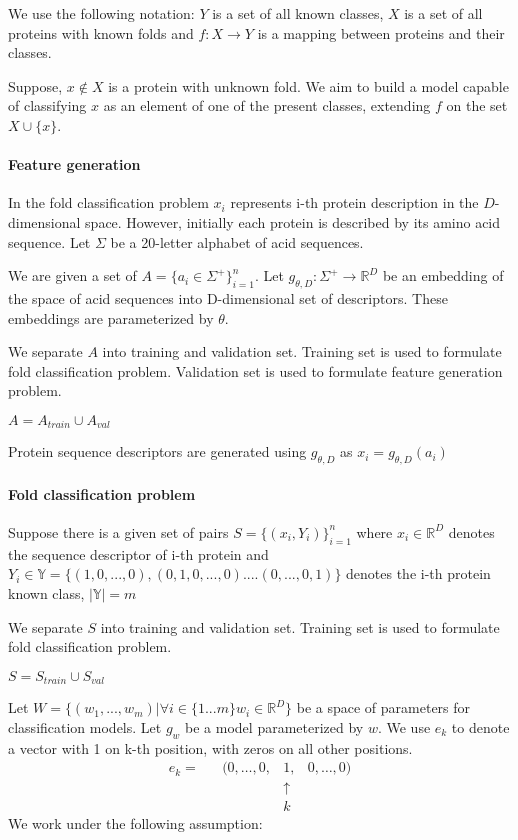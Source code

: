 \documentclass[12pt, twoside]{article}
\begin{document}
We use the following notation: $Y$ is a set of all known classes, $X$ is a set of all proteins with known folds and  $f: X \rightarrow Y$ is a mapping between proteins and their classes. 

Suppose, $x \not\in X$ is a protein with unknown fold. We aim to build a model capable of classifying $x$ as an element of one of the present classes, extending $f$ on the set $X \cup \{x\}$. 

\paragraph{Feature generation }
\noindent

In the fold classification problem $x_i$ represents i-th protein description in the $D$-dimensional space. However, initially each protein is described by its amino acid sequence. Let $\Sigma$ be a 20-letter alphabet of acid sequences.  

We are given a set of $A = \{a_i \in \Sigma^+\}_{i = 1}^n$. Let $g_{\theta, D}: \Sigma^+ \rightarrow \mathbb{R}^D$ be an embedding of the space of acid sequences into D-dimensional set of descriptors. These embeddings are parameterized  by $\theta$.

We separate $A$ into training and validation set. Training set is used to formulate fold classification problem. Validation set is used to formulate feature generation problem. 

$A = A_{train} \cup A_{val}$ 

Protein sequence descriptors are generated using $g_{\theta, D}$ as $x_i = g_{\theta, D}(a_i)$ 

\paragraph{Fold classification problem}
\noindent

Suppose there is a given set of pairs $S = \{ (x_i, Y_i)\}_{i = 1}^n$ where $ x_i \in \mathbb{R}^D$ denotes the sequence descriptor of i-th protein and $ Y_i \in \mathbb{Y} = \{ (1, 0, ..., 0), (0, 1, 0, ..., 0) .... (0, ..., 0, 1) \}$ denotes the i-th protein known class, $|\mathbb{Y}| = m$

We separate $S$ into training and validation set. Training set is used to formulate fold classification problem.  

$S = S_{train} \cup S_{val}$

Let $W = \{(w_1, ..., w_m)| \forall i \in \{1...m\} w_i \in \mathbb{R}^D\}$ be a space of parameters for classification models. Let $g_w$ be a model parameterized by $w$.
We use $e_k$ to denote a vector with 1 on k-th position, with zeros on all other positions.
\[
\begin{matrix}
e_{k} = &
        &(0,\ldots,0,&1,&0,\dots,0)\\
        &&&\uparrow&      \\
        &&&k&           
\end{matrix}
\]
We work under the following assumption:  
\end{document}

